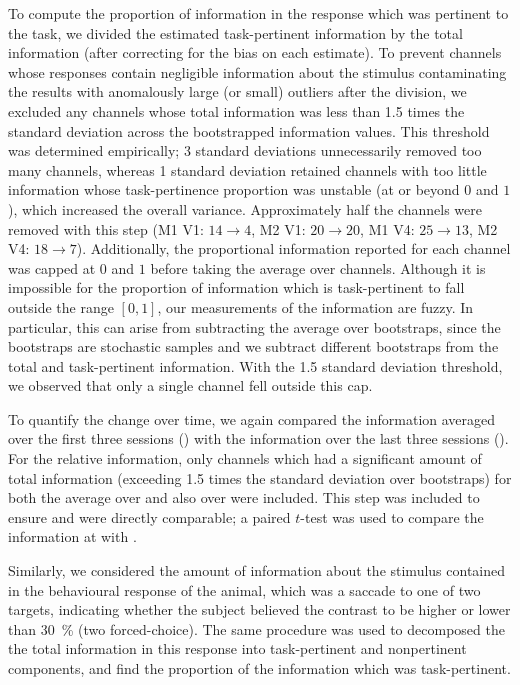 To compute the proportion of information in the response which was pertinent to the task, we divided the estimated task-pertinent information by the total information (after correcting for the bias on each estimate).
To prevent channels whose responses contain negligible information about the stimulus contaminating the results with anomalously large (or small) outliers after the division, we excluded any channels whose total information was less than \num{1.5} times the standard deviation across the bootstrapped information values.
This threshold was determined empirically; \num{3} standard deviations unnecessarily removed too many channels, whereas \num{1} standard deviation retained channels with too little information whose task-pertinence proportion was unstable (at or beyond $0$ and $1$), which increased the overall variance.
Approximately half the channels were removed with this step (\ac{M1} \ac{V1}: $14\to4$, \ac{M2} \ac{V1}: $20\to20$, \ac{M1} \ac{V4}: $25\to13$, \ac{M2} \ac{V4}: $18\to7$).
Additionally, the proportional information reported for each channel was capped at $0$ and $1$ before taking the average over channels.
Although it is impossible for the proportion of information which is task-pertinent to fall outside the range $[0, 1]$, our measurements of the information are fuzzy.
In particular, this can arise from subtracting the average over bootstraps, since the bootstraps are stochastic samples and we subtract different bootstraps from the total and task-pertinent information.
With the \num{1.5} standard deviation threshold, we observed that only a single channel fell outside this cap.

To quantify the change over time, we again compared the information averaged over the first three sessions () with the information over the last three sessions ().
For the relative information, only channels which had a significant amount of total information (exceeding \num{1.5} times the standard deviation over bootstraps) for both the average over  and also over were included.
This step was included to ensure  and  were directly comparable; a paired $t$-test was used to compare the information at  with .

Similarly, we considered the amount of information about the stimulus contained in the behavioural response of the animal, which was a saccade to one of two targets, indicating whether the subject believed the contrast to be higher or lower than \SI{30}{\percent} (two forced-choice).
The same procedure was used to decomposed the the total information in this response into task-pertinent and nonpertinent components, and find the proportion of the information which was task-pertinent.


